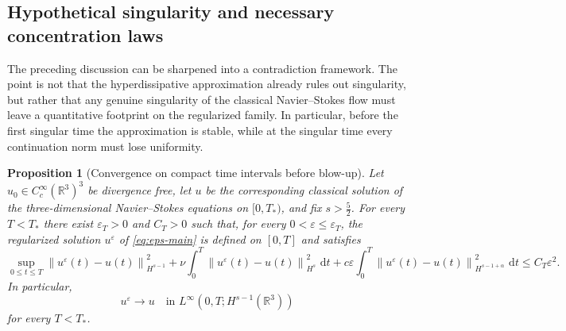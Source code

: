 \documentclass[11pt]{article}
\newtheorem{proposition}[theorem]{Proposition}
\theoremstyle{definition}
\theoremstyle{remark}
\newcommand{\R}{\mathbb{R}}
\newcommand{\dd}{\,\mathrm{d}}
\newcommand{\norm}[1]{\left\lVert #1\right\rVert}
\begin{document}
\subsection{Hypothetical singularity and necessary concentration laws}

The preceding discussion can be sharpened into a contradiction framework. The point is not that the hyperdissipative approximation already rules out singularity, but rather that any genuine singularity of the classical Navier--Stokes flow must leave a quantitative footprint on the regularized family. In particular, before the first singular time the approximation is stable, while at the singular time every continuation norm must lose uniformity.

\begin{proposition}[Convergence on compact time intervals before blow-up]\label{prop:pre-singular-stability}
Let $u_0\in C_c^\infty(\R^3)^3$ be divergence free, let $u$ be the corresponding classical solution of the three-dimensional Navier--Stokes equations on $[0,T_*)$, and fix $s>\frac52$. For every $T<T_*$ there exist $\varepsilon_T>0$ and $C_T>0$ such that, for every $0<\varepsilon\le \varepsilon_T$, the regularized solution $u^\varepsilon$ of \eqref{eq:eps-main} is defined on $[0,T]$ and satisfies
\begin{equation}\label{eq:pre-singular-convergence}
\sup_{0\le t\le T}\norm{u^\varepsilon(t)-u(t)}_{H^{s-1}}^2
+\nu\int_0^T \norm{u^\varepsilon(t)-u(t)}_{H^s}^2\,\dd t
+c\varepsilon\int_0^T \norm{u^\varepsilon(t)-u(t)}_{H^{s-1+\alpha}}^2\,\dd t
\le C_T\varepsilon^2.
\end{equation}
In particular,
\[
u^\varepsilon\to u\quad\text{in }L^\infty(0,T;H^{s-1}(\R^3))\]
for every $T<T_*$.
\end{proposition}
\end{document}
